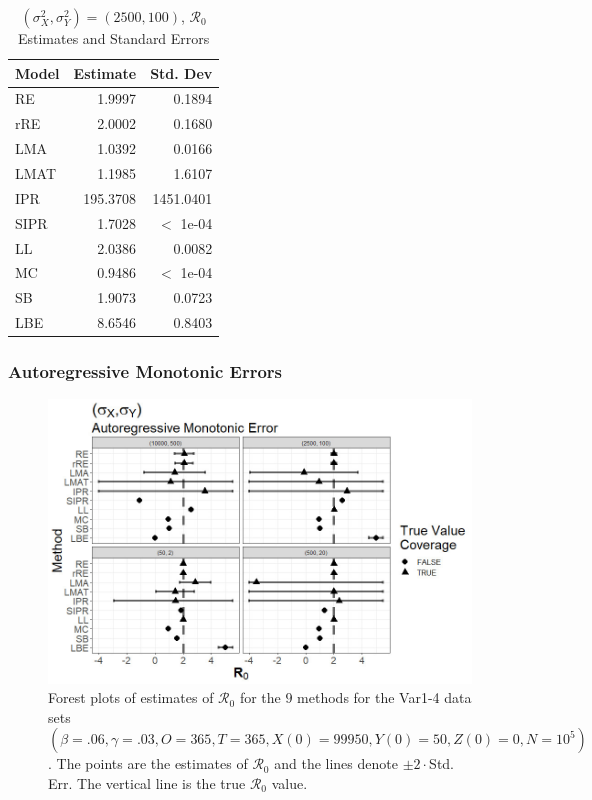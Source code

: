 \documentclass[12pt]{article}
\newcommand{\xxsir}{\ensuremath{9} } %
\newcommand{\rr}{\ensuremath{\mathcal{R}_0}}
\begin{document}
\begin{table}[H]
	
	
	\centering
	\begin{tabular}[t]{l|r|r}
		\hline
		Model & Estimate & Std. Dev\\
		\hline
		RE & 1.9997 & 0.1894\\
		\hline
		rRE & 2.0002 & 0.1680\\
		\hline
		LMA & 1.0392 & 0.0166\\
		\hline
		LMAT & 1.1985 & 1.6107\\
		\hline
		IPR & 195.3708 & 1451.0401\\
		\hline
		SIPR & 1.7028 & $<$ 1e-04\\
		\hline
		LL & 2.0386 & 0.0082\\
		\hline
		MC & 0.9486 & $<$ 1e-04\\
		\hline
		SB & 1.9073 & 0.0723\\
		\hline
		LBE & 8.6546 & 0.8403\\
		\hline
	\end{tabular}
	\caption{$(\sigma^2_X, \sigma^2_Y) = (2500, 100)$, $\rr$ Estimates and Standard Errors}
\end{table}

\subsubsection{Autoregressive Monotonic Errors}

\begin{figure}[H]
	\begin{center}
		\includegraphics[scale=0.5]{images/var_arm.jpg}
		\caption{Forest plots of estimates of $\rr$ for the \xxsir methods for the Var1-4 data sets $(\beta=.06, \gamma=.03, O=365, T=365, X(0)=99950, Y(0)=50, Z(0)=0, N=10^5)$.  The points are the estimates of $\rr$ and the lines denote $\pm 2\cdot $Std. Err.  The vertical line is the true $\rr$ value.}
	\end{center}
\end{figure}
\end{document}
